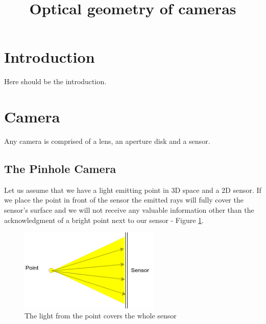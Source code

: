\documentclass[a4paper,10pt]{article}
\title{Optical geometry of cameras}
\begin{document}
\maketitle



\section{Introduction}
Here should be the introduction.
\section{Camera}

Any camera is comprised of a lens, an aperture disk and a sensor. 

\subsection{ The Pinhole Camera}

Let us assume that we have a light emitting point in 3D space and a 2D sensor. If we place the point in front of the sensor the emitted rays  will fully cover the  sensor's surface and we will not receive any valuable information other than the acknowledgment of a bright point next to our sensor -  Figure \ref{fig:point_and_sensor}.

\begin{figure}[h]
\centering
 \includegraphics[width=0.6\textwidth]{../../images/point.png}
 \caption{The light from the point covers the whole sensor}
 \label{fig:point_and_sensor}
\end{figure}
\end{document}
